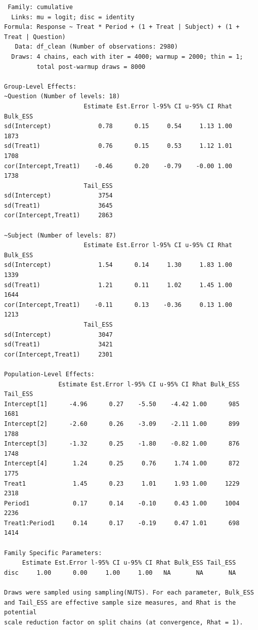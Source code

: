 \documentclass[
  12pt,
  a4paper,
  extrafontsizes,
  onecolumn,
  openright,
  table]{memoir}
\begin{document}
\begin{verbatim}
 Family: cumulative 
  Links: mu = logit; disc = identity 
Formula: Response ~ Treat * Period + (1 + Treat | Subject) + (1 + Treat | Question) 
   Data: df_clean (Number of observations: 2980) 
  Draws: 4 chains, each with iter = 4000; warmup = 2000; thin = 1;
         total post-warmup draws = 8000

Group-Level Effects: 
~Question (Number of levels: 18) 
                      Estimate Est.Error l-95% CI u-95% CI Rhat Bulk_ESS
sd(Intercept)             0.78      0.15     0.54     1.13 1.00     1873
sd(Treat1)                0.76      0.15     0.53     1.12 1.01     1708
cor(Intercept,Treat1)    -0.46      0.20    -0.79    -0.00 1.00     1738
                      Tail_ESS
sd(Intercept)             3754
sd(Treat1)                3645
cor(Intercept,Treat1)     2863

~Subject (Number of levels: 87) 
                      Estimate Est.Error l-95% CI u-95% CI Rhat Bulk_ESS
sd(Intercept)             1.54      0.14     1.30     1.83 1.00     1339
sd(Treat1)                1.21      0.11     1.02     1.45 1.00     1644
cor(Intercept,Treat1)    -0.11      0.13    -0.36     0.13 1.00     1213
                      Tail_ESS
sd(Intercept)             3047
sd(Treat1)                3421
cor(Intercept,Treat1)     2301

Population-Level Effects: 
               Estimate Est.Error l-95% CI u-95% CI Rhat Bulk_ESS Tail_ESS
Intercept[1]      -4.96      0.27    -5.50    -4.42 1.00      985     1681
Intercept[2]      -2.60      0.26    -3.09    -2.11 1.00      899     1788
Intercept[3]      -1.32      0.25    -1.80    -0.82 1.00      876     1748
Intercept[4]       1.24      0.25     0.76     1.74 1.00      872     1775
Treat1             1.45      0.23     1.01     1.93 1.00     1229     2318
Period1            0.17      0.14    -0.10     0.43 1.00     1004     2236
Treat1:Period1     0.14      0.17    -0.19     0.47 1.01      698     1414

Family Specific Parameters: 
     Estimate Est.Error l-95% CI u-95% CI Rhat Bulk_ESS Tail_ESS
disc     1.00      0.00     1.00     1.00   NA       NA       NA

Draws were sampled using sampling(NUTS). For each parameter, Bulk_ESS
and Tail_ESS are effective sample size measures, and Rhat is the potential
scale reduction factor on split chains (at convergence, Rhat = 1).
\end{verbatim}

\normalsize
\end{document}
